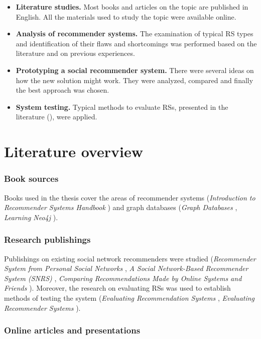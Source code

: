 \documentclass[12pt]{report}
\begin{document}
\begin{itemize}
\item {\bf Literature studies.} Most books and articles on the topic are published in English. All the materials used to study the topic were available online. 
\item {\bf Analysis of recommender systems.} The examination of typical RS types and identification of their flaws and shortcomings was performed based on the literature and on previous experiences.
\item {\bf Prototyping a social recommender system.} There were several ideas on how the new solution might work. They were analyzed, compared and finally the best approach was chosen.
\item {\bf System testing.} Typical methods to evaluate RSs, presented in the literature (\cite{eval_microsoft, eval_twente}), were applied. 
\end{itemize}

\section{Literature overview}

\subsubsection{Book sources}
Books used in the thesis cover the areas of recommender systems (\textit{Introduction to Recommender Systems Handbook} \cite{rec_sys_handbook}) and graph databases (\textit{Graph Databases} \cite{graph_databases}, \textit{Learning Neo4j} \cite{learning_neo4j}).

\subsubsection{Research publishings}

Publishings on existing social network recommenders were studied (\textit{Recommender System from Personal Social Networks} \cite{ben_gurion}, \textit{A Social Network-Based Recommender System (SNRS)} \cite{snrs}, \textit{Comparing Recommendations Made by Online Systems and Friends} \cite{sinha}). Moreover, the research on evaluating RSs was used to establish methods of testing the system (\textit{Evaluating Recommendation Systems} \cite{eval_microsoft}, \textit{Evaluating Recommender Systems} \cite{eval_twente}).

\subsubsection{Online articles and presentations}
\end{document}
